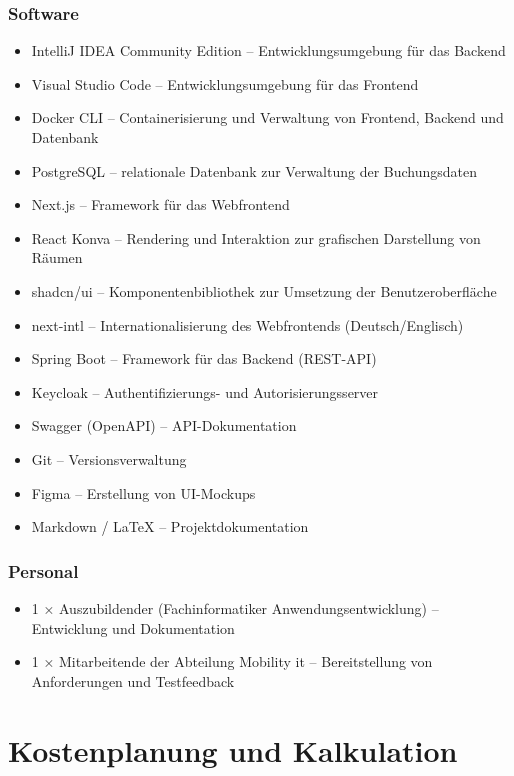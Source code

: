 \documentclass[11pt,a4paper]{report}
\begin{document}
\subsubsection{Software}
\begin{itemize}
  \item IntelliJ IDEA Community Edition -- Entwicklungsumgebung für das Backend
  \item Visual Studio Code -- Entwicklungsumgebung für das Frontend
  \item Docker CLI -- Containerisierung und Verwaltung von Frontend, Backend und Datenbank
  \item PostgreSQL -- relationale Datenbank zur Verwaltung der Buchungsdaten
  \item Next.js -- Framework für das Webfrontend
  \item React Konva -- Rendering und Interaktion zur grafischen Darstellung von Räumen
  \item shadcn/ui -- Komponentenbibliothek zur Umsetzung der Benutzeroberfläche
  \item next-intl -- Internationalisierung des Webfrontends (Deutsch/Englisch)
  \item Spring Boot -- Framework für das Backend (REST-API)
  \item Keycloak -- Authentifizierungs- und Autorisierungsserver
  \item Swagger (OpenAPI) -- API-Dokumentation
  \item Git -- Versionsverwaltung
  \item Figma -- Erstellung von UI-Mockups
  \item Markdown / LaTeX -- Projektdokumentation
  \end{itemize}

\subsubsection{Personal}
\begin{itemize}
  \item 1 × Auszubildender (Fachinformatiker Anwendungsentwicklung) -- Entwicklung und Dokumentation
  \item 1 × Mitarbeitende der Abteilung Mobility \gls{it} -- Bereitstellung von Anforderungen und Testfeedback
\end{itemize}

\section{Kostenplanung und Kalkulation}
\end{document}
